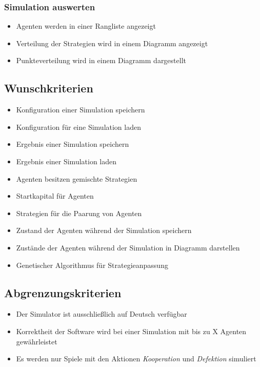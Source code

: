 \subsubsection{Simulation auswerten}
\begin{itemize}
\item Agenten werden in einer Rangliste angezeigt
\item Verteilung der Strategien wird in einem Diagramm angezeigt
\item Punkteverteilung wird in einem Diagramm dargestellt
\end{itemize}

%

\subsection{Wunschkriterien}
\begin{itemize}
\item Konfiguration einer Simulation speichern
\item Konfiguration für eine Simulation laden
\item Ergebnis einer Simulation speichern
\item Ergebnis einer Simulation laden
\item Agenten besitzen gemischte Strategien
\item Startkapital für Agenten
\item Strategien für die Paarung von Agenten
\item Zustand der Agenten während der Simulation speichern
\item Zustände der Agenten während der Simulation in Diagramm darstellen
\item Genetischer Algorithmus für Strategieanpassung
\end{itemize}

\subsection{Abgrenzungskriterien}
\begin{itemize}
\item Der Simulator ist ausschließlich auf Deutsch verfügbar
\item Korrektheit der Software wird bei einer Simulation mit bis zu X Agenten gewährleistet
\item Es werden nur Spiele mit den Aktionen \emph{Kooperation} und \emph{Defektion} simuliert 
\end{itemize}